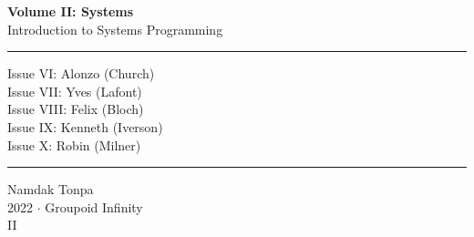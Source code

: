 \documentclass{article}
\begin{document}
\begin{titlepage}
    \centering
    \vspace*{0.5in}
    \Huge
    \textbf{Volume II: Systems} \\
    \LARGE
    Introduction to Systems Programming \\
    \vspace{1.5in}
    \flushleft
    \small
    \vspace{-2mm} \rule{\textwidth}{0.4pt}
    Issue VI: Alonzo (Church) \\
    Issue VII: Yves (Lafont) \\
    Issue VIII: Felix (Bloch) \\
    Issue IX: Kenneth (Iverson) \\
    Issue X: Robin (Milner) \\
    \vspace{-2mm} \rule{\textwidth}{0.4pt}
    \centering
    \vfill
    \large
    Namdak Tonpa \\
    \Large
    2022 $\cdot$ Groupoid Infinity \\
    II
\end{titlepage}

\tableofcontents
\newif\ifincludeTOC
\includeTOCfalse

\newpage \begin{standalone}   \end{standalone} %
\newpage \begin{standalone}     \end{standalone} %
\newpage \begin{standalone}    \end{standalone} %
\newpage \begin{standalone}  \end{standalone} %
\newpage \begin{standalone}    \end{standalone} %
\end{document}
